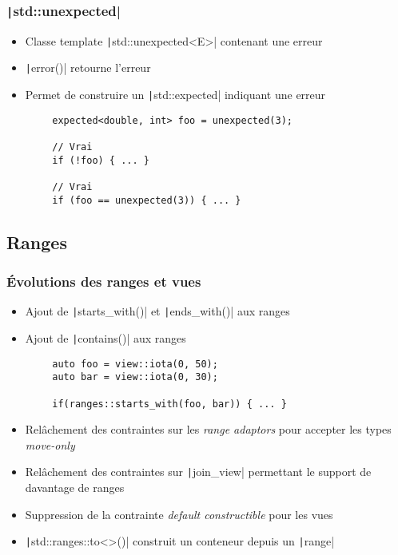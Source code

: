 \documentclass[C++.tex]{subfiles}
\begin{document}
\begin{frame}[fragile]
	\frametitle{\texttt|std::unexpected|}
	\begin{itemize}
		\item Classe template \texttt|std::unexpected<E>| contenant une erreur
		\item \texttt|error()| retourne l'erreur
		\item Permet de construire un \texttt|std::expected| indiquant une erreur
	\end{itemize}

	\begin{verbatim}
		expected<double, int> foo = unexpected(3);

		// Vrai
		if (!foo) { ... }

		// Vrai
		if (foo == unexpected(3)) { ... }
	\end{verbatim}
\end{frame}

\subsection*{Ranges}
\begin{frame}[fragile]
	\frametitle{Évolutions des ranges et vues}
	\begin{itemize}
		\item Ajout de \texttt|starts_with()| et \texttt|ends_with()| aux ranges
		\item Ajout de \texttt|contains()| aux ranges
	\end{itemize}

	\begin{verbatim}
		auto foo = view::iota(0, 50);
		auto bar = view::iota(0, 30);

		if(ranges::starts_with(foo, bar)) { ... }
	\end{verbatim}

	\begin{itemize}
		\item Relâchement des contraintes sur les \textit{range adaptors} pour accepter les types \textit{move-only}
		\item Relâchement des contraintes sur \texttt|join_view| permettant le support de davantage de ranges


		\item Suppression de la contrainte \textit{default constructible} pour les vues
		\item \texttt|std::ranges::to<>()| construit un conteneur depuis un \texttt|range|
	\end{itemize}
\end{frame}
\end{document}
